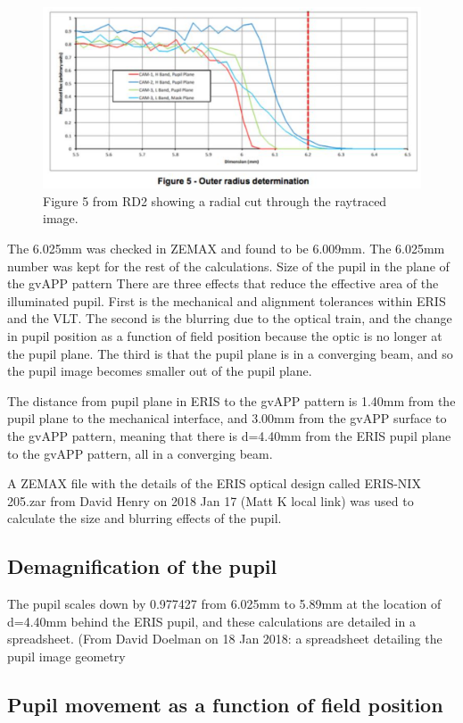 \documentclass[a4paper,11pt]{article}
\begin{document}
\begin{figure}[htp]
\centering
\includegraphics[angle=0,width=0.7\columnwidth]{pupil_cut}
\caption{ \label{fig:radpup} Figure 5 from RD2 showing a radial cut
through the raytraced image.}
\end{figure}

The 6.025mm was checked in ZEMAX and found to be 6.009mm. The 6.025mm number
was kept for the rest of the calculations.  Size of the pupil in the plane of
the gvAPP pattern There are three effects that reduce the effective area of the
illuminated pupil. First is the mechanical and alignment tolerances within ERIS
and the VLT. The second is the blurring due to the optical train, and the
change in pupil position as a function of field position because the optic is
no longer at the pupil plane. The third is that the pupil plane is in a
converging beam, and so the pupil image becomes smaller out of the pupil plane.

The distance from pupil plane in ERIS to the gvAPP pattern is 1.40mm from the
pupil plane to the mechanical interface, and 3.00mm from the gvAPP surface to
the gvAPP pattern, meaning that there is d=4.40mm from the ERIS pupil plane to
the gvAPP pattern, all in a converging beam.

A ZEMAX file with the details of the ERIS optical design called ERIS-NIX
205.zar from David Henry on 2018 Jan 17 (Matt K local link) was used to
calculate the size and blurring effects of the pupil.


\subsection{Demagnification of the pupil}

The pupil scales down by 0.977427 from 6.025mm to 5.89mm at the location of
d=4.40mm behind the ERIS pupil, and these calculations are detailed in a
spreadsheet. (From David Doelman on 18 Jan 2018: a spreadsheet detailing the
pupil image geometry %

\subsection{Pupil movement as a function of field position}
\end{document}
